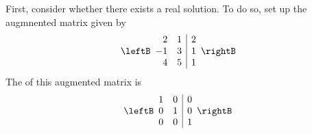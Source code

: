 \begin{solution}
First, consider whether there exists a real solution. To do so, set up the augmnented matrix given by
\begin{equation*}
\leftB
\begin{array}{rr|r}
2 & 1 & 2 \\ 
-1 & 3 & 1 \\ 
4 & 5 & 1
\end{array}
\rightB
\end{equation*}
The \rref\; of this augmented matrix is 
\begin{equation*}
\leftB
\begin{array}{rr|r}
1 & 0 & 0 \\ 
0 & 1 & 0 \\ 
0 & 0 & 1
\end{array}
\rightB
\end{equation*}


\end{solution}
